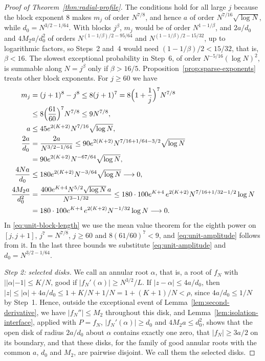 \begin{proof}[Proof of Theorem~\ref{thm:radial-profile}]
The conditions hold for all large $j$ because the block exponent $8$
makes $m_j$ of order $N^{7/8}$, and hence $a$ of order
$N^{7/16}\sqrt{\log N}$, while $d_0=N^{3/2-1/64}$.
With blocks $j^\beta$, $m_j$ would be of order $N^{1-1/\beta}$, and
$2a/d_0$ and $4M_2a/d_0^2$ of orders $N^{(1-1/\beta)/2-95/64}$ and
$N^{(1-1/\beta)/2-15/32}$, up to logarithmic factors, so Steps~2 and~4
would need $(1-1/\beta)/2<15/32$, that is, $\beta<16$. The slowest
exceptional probability in Step~6, of order $N^{-5/16}(\log N)^2$, is
summable along $N=j^\beta$ only if $\beta>16/5$.
Proposition~\ref{prop:sparse-exponents} treats other block exponents.
For $j\ge60$ we have
\begin{align}
 m_j&=(j+1)^8-j^8\le8(j+1)^7=8\Bigl(1+\frac1j\Bigr)^7N^{7/8}\nonumber\\
 &\le8\Bigl(\frac{61}{60}\Bigr)^7N^{7/8}\le9N^{7/8},
 \label{eq:unit-block-length}\\
 a&\le45e^{2(K+2)}N^{7/16}\sqrt{\log N},\label{eq:unit-amplitude}\\
 \frac{2a}{d_0}
 &=\frac{2a}{N^{3/2-1/64}}
 \le90e^{2(K+2)}N^{7/16+1/64-3/2}\sqrt{\log N}\nonumber\\
 &=90e^{2(K+2)}N^{-67/64}\sqrt{\log N},\label{eq:unit-radius}\\
 \frac{4Na}{d_0}&\le180e^{2(K+2)}N^{-3/64}\sqrt{\log N}\longrightarrow0,
 \label{eq:unit-radius-scaled}\\
 \frac{4M_2a}{d_0^2}
 &=\frac{400e^{K+4}N^{5/2}\sqrt{\log N}\,a}{N^{3-1/32}}
 \le180\cdot100e^{K+4}\,e^{2(K+2)}N^{7/16+1/32-1/2}\log N\nonumber\\
 &=180\cdot100e^{K+4}\,e^{2(K+2)}N^{-1/32}\log N\longrightarrow0.
 \label{eq:unit-parameters}
\end{align}
In \eqref{eq:unit-block-length} we use the mean value theorem for the
eighth power on $[j,j+1]$, $j^7=N^{7/8}$, $j\ge60$ and $8(61/60)^7<9$,
and \eqref{eq:unit-amplitude} follows from it. In the last three bounds
we substitute \eqref{eq:unit-amplitude} and $d_0=N^{3/2-1/64}$.

\emph{Step 2: selected disks.}
We call an annular root $\alpha$, that is, a root of $f_N$ with
$||\alpha|-1|\le K/N$, good if $|f_N'(\alpha)|\ge N^{3/2}/L$.
If $|z-\alpha|\le4a/d_0$, then
$|z|\le|\alpha|+4a/d_0\le1+K/N+1/N=1+(K+1)/N<\rho$, since $4a/d_0\le1/N$
by Step~1.
Hence, outside the exceptional event of
Lemma~\ref{lem:second-derivative}, we have $|f_N''|\le M_2$ throughout
this disk, and Lemma~\ref{lem:isolation-interface}, applied with
$P=f_N$, $|f_N'(\alpha)|\ge d_0$ and $4M_2a\le d_0^2$, shows that the
open disk of radius $2a/d_0$ about $\alpha$ contains exactly one zero,
that $|f_N|\ge3a/2$ on its boundary, and that these disks, for the family
of good annular roots with the common $a$, $d_0$ and $M_2$, are pairwise
disjoint. We call them the selected disks.


\end{proof}
